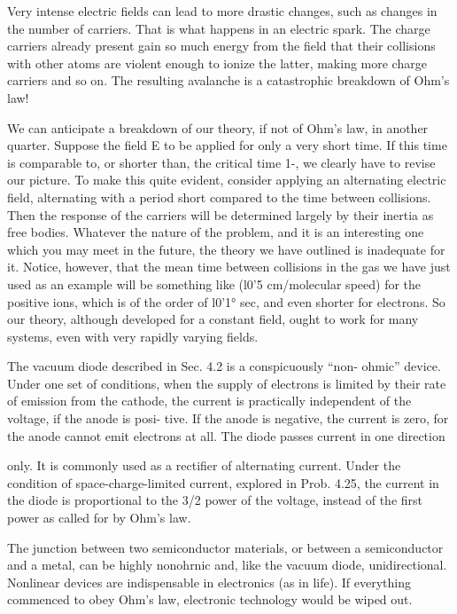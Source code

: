 Very intense electric fields can lead to more drastic changes, such
as changes in the number of carriers. That is what happens in an
electric spark. The charge carriers already present gain so much
energy from the field that their collisions with other atoms are violent
enough to ionize the latter, making more charge carriers and so on.
The resulting avalanche is a catastrophic breakdown of Ohm's law!

We can anticipate a breakdown of our theory, if not of Ohm's law,
in another quarter. Suppose the field E to be applied for only a very
short time. If this time is comparable to, or shorter than, the critical
time 1-, we clearly have to revise our picture. To make this quite
evident, consider applying an alternating electric field, alternating
with a period short compared to the time between collisions. Then
the response of the carriers will be determined largely by their inertia
as free bodies. Whatever the nature of the problem, and it is an interesting
one which you may meet in the future, the theory we have
outlined is inadequate for it. Notice, however, that the mean time
between collisions in the gas we have just used as an example will be
something like (l0'5 cm/molecular speed) for the positive ions,
which is of the order of l0'1° sec, and even shorter for electrons. So
our theory, although developed for a constant field, ought to work
for many systems, even with very rapidly varying fields.

The vacuum diode described in Sec. 4.2 is a conspicuously ``non-
ohmic'' device. Under one set of conditions, when the supply of
electrons is limited by their rate of emission from the cathode, the
current is practically independent of the voltage, if the anode is posi-
tive. If the anode is negative, the current is zero, for the anode cannot
emit electrons at all. The diode passes current in one direction

only. It is commonly used as a rectifier of alternating current.
Under the condition of space-charge-limited current, explored in
Prob. 4.25, the current in the diode is proportional to the 3/2 power
of the voltage, instead of the first power as called for by Ohm's law.

The junction between two semiconductor materials, or between a
semiconductor and a metal, can be highly nonohrnic and, like the
vacuum diode, unidirectional. Nonlinear devices are indispensable
in electronics (as in life). If everything commenced to obey Ohm's
law, electronic technology would be wiped out.

